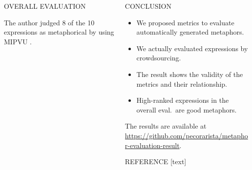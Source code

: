 \documentclass[unicode,20pt]{beamer}
\newcommand\msubsection[1]{\textcolor{sPink}{\textbf{\large \exo{#1}}}}
\begin{document}
\begin{frame}
\begin{columns}[t]
\begin{column}{.47\textwidth}
\begin{block}{OVERALL EVALUATION}
                \bigskip

                \msubsection{Metaphoricity}

                The author judged 8 of the 10 expressions as metaphorical
                by using MIPVU \citep{steen2010}.
            \end{block}

        \end{column}

        \begin{column}{.47\textwidth}

            \begin{block}{CONCLUSION}
                \setlength\leftmargini{2.8em}
                \begin{itemize}
                    \item We proposed metrics to evaluate automatically generated metaphors.

                    \item We actually evaluated expressions by crowdsourcing.

                    \item The result shows the validity of the metrics
                            and their relationship.

                    \item High-ranked expressions
                        in the overall eval.\ are good metaphors.
                \end{itemize}

                \bigskip
                \bigskip

                The results are available at
                \href{https://github.com/pecorarista/metaphor-evaluation-result}{\textcolor{sDarkBlue}{https://github.com/pecorarista/metaphor-evaluation-result}}.
            \end{block}

            \begin{block}{REFERENCE}
                [text]
                \begin{indentation}{1.3em}{1em}
                    \printbibliography
                \end{indentation}
            \end{block}
        \end{column}
    \end{columns}
\end{frame}
\end{document}
